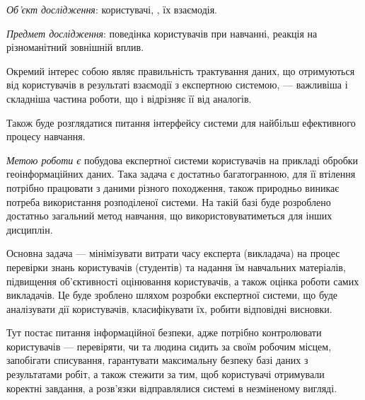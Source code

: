 


\textit{Об’єкт дослідження}:
користувачі, , їх взаємодія.

\textit{Предмет дослідження}:
поведінка користувачів при навчанні, реакція на різноманітний зовнішній вплив.

Окремий інтерес собою являє правильність трактування даних, що отримуються від
користувачів в результаті взаємодії з експертною системою, --- важливіша і
складніша частина роботи, що і відрізняє її від аналогів.

Також буде розглядатися питання  інтерфейсу
системи для найбільш ефективного процесу навчання.

\textit{Метою роботи є}
побудова експертної системи 
користувачів на прикладі обробки геоінформаційних даних.
Така задача є достатньо багатогранною, для її втілення потрібно працювати
з даними різного походження, також природньо виникає потреба використання
розподіленої системи.
На такій базі буде розроблено достатньо загальний метод навчання,
що використовуватиметься для інших дисциплін.

Основна задача --- мінімізувати витрати часу експерта (викладача) на процес
перевірки знань користувачів (студентів) та надання їм навчальних матеріалів,
підвищення об’єктивності оцінювання користувачів, а також оцінка роботи
самих викладачів.
Це буде зроблено шляхом розробки експертної системи, що буде аналізувати дії
користувачів, класифікувати їх, робити відповідні висновки.

Тут постає питання інформаційної безпеки, адже потрібно контролювати
користувачів --- перевіряти, чи та людина сидить за своїм робочим місцем,
запобігати списування, гарантувати максимальну безпеку базі даних з
результатами робіт, а також стежити за тим, щоб користувачі отримували коректні
завдання, а розв’язки відправлялися системі в незміненому вигляді.
